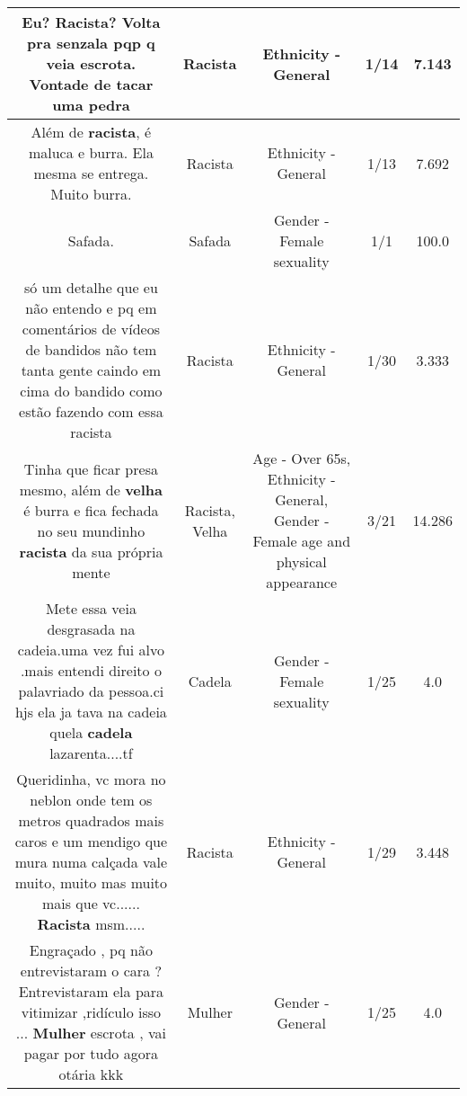 \documentclass[11pt]{article}
\newlength\mylength
\begin{document}
\begin{center}
\begin{longtable}{|C{.65\mylength}|C{.30\mylength}|C{.12\mylength}|C{.12\mylength}|C{.12\mylength}|}
  \small Eu? \textbf{Racista}? Volta pra senzala pqp q veia escrota. Vontade de tacar uma pedra\normalsize   & Racista & Ethnicity - General & 1/14 & 7.143 \\  \hline
  \small Além de \textbf{racista}, é maluca e burra. Ela mesma se entrega. Muito burra.\normalsize   & Racista & Ethnicity - General & 1/13 & 7.692 \\  \hline
  \small Safada.\normalsize   & Safada & Gender - Female sexuality & 1/1 & 100.0 \\  \hline
  \small só um detalhe que eu não entendo e pq em comentários de vídeos de bandidos não tem tanta gente caindo em cima do bandido como estão fazendo com essa racista\normalsize   & Racista & Ethnicity - General & 1/30 & 3.333 \\  \hline
  \small Tinha que ficar presa mesmo, além de \textbf{v\textbf{elha}} é burra e fica fechada no seu mundinho \textbf{racista} da sua própria mente\normalsize   & Racista, Velha & Age - Over 65s, Ethnicity - General, Gender - Female age and physical appearance & 3/21 & 14.286 \\  \hline
  \small Mete essa veia desgrasada na cadeia.uma vez fui alvo .mais entendi direito o palavriado da pessoa.ci hjs ela ja tava na cadeia quela \textbf{cadela} lazarenta....tf\normalsize   & Cadela & Gender - Female sexuality & 1/25 & 4.0 \\  \hline
  \small Queridinha, vc mora no neblon onde tem os metros quadrados mais caros e um mendigo que mura  numa calçada vale muito, muito mas muito mais que vc...... \textbf{Racista} msm.....\normalsize   & Racista & Ethnicity - General & 1/29 & 3.448 \\  \hline
  \small Engraçado , pq não entrevistaram o cara ? Entrevistaram ela para vitimizar ,ridículo isso ... \textbf{Mulher} escrota , vai pagar por tudo agora otária kkk\normalsize   & Mulher & Gender - General & 1/25 & 4.0 \\  \hline

\end{longtable}
\end{center}
\end{document}
